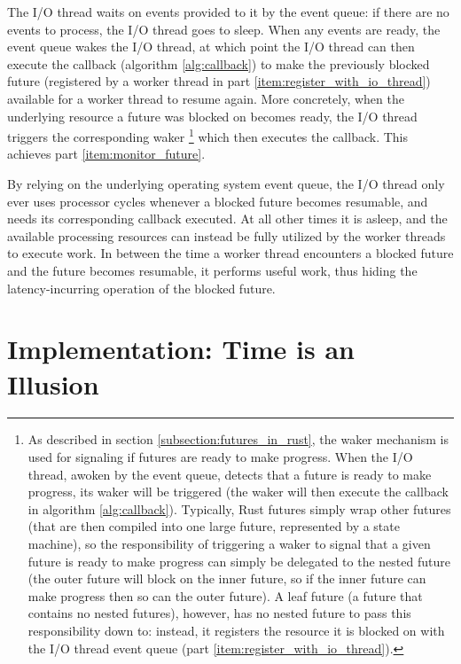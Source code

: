\documentclass[bsc,frontabs,singlespacing,parskip,deptreport,normalheadings]{infthesis}
\begin{document}
The I/O thread waits on events provided to it by the event queue: if there are
no events to process, the I/O thread goes to sleep. When any events are ready,
the event queue wakes the I/O thread, at which point the I/O thread can then
execute the callback (algorithm \ref{alg:callback}) to make the previously
blocked future (registered by a worker thread in part
\ref{item:register_with_io_thread}) available for a worker thread to resume
again. More concretely, when the underlying resource a future was blocked on
becomes ready, the I/O thread triggers the corresponding waker \footnote{ As
    described in section \ref{subsection:futures_in_rust}, the waker mechanism
    is used for signaling if futures are ready to make progress. When the I/O
    thread, awoken by the event queue, detects that a future is ready to make
    progress, its waker will be triggered (the waker will then execute the
    callback in algorithm \ref{alg:callback}). Typically, Rust futures simply
    wrap other futures (that are then compiled into one large future,
    represented by a state machine), so the responsibility of triggering a waker
    to signal that a given future is ready to make progress can simply be
    delegated to the nested future (the outer future will block on the inner
    future, so if the inner future can make progress then so can the outer
    future). A leaf future (a future that contains no nested futures), however,
has no nested future to pass this responsibility down to: instead, it registers
the resource it is blocked on with the I/O thread event queue (part
\ref{item:register_with_io_thread}).} which then executes the callback. This
achieves part \ref{item:monitor_future}.

By relying on the underlying operating system event queue, the I/O thread only
ever uses processor cycles whenever a blocked future becomes resumable, and
needs its corresponding callback executed. At all other times it is asleep, and
the available processing resources can instead be fully utilized by the worker
threads to execute work. In between the time a worker thread encounters a
blocked future and the future becomes resumable, it performs useful work, thus
hiding the latency-incurring operation of the blocked future.


\chapter{Implementation: Time is an Illusion}
\end{document}

